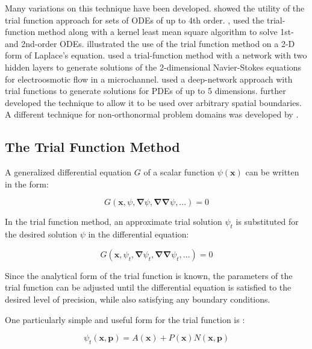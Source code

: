 \documentclass{article}
\begin{document}
Many variations on this technique have been developed. \cite{Malek2006} showed the utility of the trial function approach for sets of ODEs of up to 4th order. \cite{Yazdi2011a}, \cite{Yazdi2011b} used the trial-function method along with a kernel least mean square algorithm to solve 1st- and 2nd-order ODEs. \cite{Chiaramonte2013} illustrated the use of the trial function method on a 2-D form of Laplace's equation. \cite{Baymani2014} used a trial-function method with a network with two hidden layers to generate solutions of the 2-dimensional Navier-Stokes equations for electroosmotic flow in a microchannel. \cite{Avrutskiy2017} used a deep-network approach with trial functions to generate solutions for PDEs of up to 5 dimensions. \cite{Berg2018} further developed the technique to allow it to be used over arbitrary spatial boundaries. A different technique for non-orthonormal problem domains was developed by \cite{McFall2009}.

\subsection{The Trial Function Method}

A generalized differential equation $G$ of a scalar function $\psi(\mathbf x)$ can be written in the form:

\begin{equation}
  G(\mathbf x, \psi, \mathbf \nabla \psi, \mathbf \nabla \mathbf \nabla \psi, ...) = 0
\end{equation}

In the trial function method, an approximate trial solution $\psi_t$ is substituted for the desired solution $\psi$ in the differential equation:

\begin{equation}
  G(\mathbf x, \psi_t, \mathbf \nabla \psi_t, \mathbf \nabla \mathbf \nabla \psi_t, ...) = 0
\end{equation}

\noindent Since the analytical form of the trial function is known, the parameters of the trial function can be adjusted until the differential equation is satisfied to the desired level of precision, while also satisfying any boundary conditions.

One particularly simple and useful form for the trial function is \cites{Lagaris1998}:

\begin{equation}
  \psi_t(\mathbf x, \mathbf p) = A(\mathbf x) + P(\mathbf x) N(\mathbf x, \mathbf p)
  \label{eq:trialfunction}
\end{equation}
\end{document}
